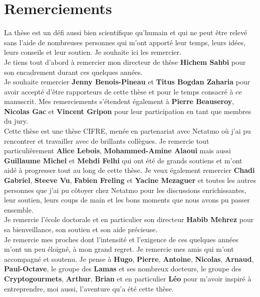 \chapter*{Remerciements}

\indent La thèse est un défi aussi bien scientifique qu'humain et qui ne peut
être relevé sans l'aide de nombreuses personnes qui m'ont apporté leur temps,
leurs idées, leurs conseils et leur soutien. Je souhaite ici les remercier.\\

Je tiens tout d'abord à remercier mon directeur de thèse \textbf{Hichem Sahbi}
pour son encadrement durant ces quelques années.\\

Je souhaite remercier \textbf{Jenny Benois-Pineau} et \textbf{Titus Bogdan
Zaharia} pour avoir accepté d'être rapporteurs de cette thèse et pour le temps
consacré à ce manuscrit. Mes remerciements s'étendent également à \textbf{Pierre
Beauseroy}, \textbf{Nicolas Gac} et \textbf{Vincent Gripon} pour leur
participation en tant que membres du jury.\\

Cette thèse est une thèse CIFRE, menée en partenariat avec Netatmo où j'ai pu
rencontrer et travailler avec de brillants collègues. Je remercie tout
particulièrement \textbf{Alice Lebois}, \textbf{Mohammed-Amine Alaoui} mais
aussi \textbf{Guillaume Michel} et \textbf{Mehdi Felhi} qui ont été de grands
soutiens et m'ont aidé à progresser tout au long de cette thèse. Je veux
également remercier \textbf{Chadi Gabriel}, \textbf{Steeve Vu}, \textbf{Fabien
Freling} et \textbf{Yacine Mezaguer} et toutes les autres personnes que j'ai pu
côtoyer chez Netatmo pour les discussions enrichissantes, leur soutien, leurs
coups de main et les bons moments que nous avons pu passer ensemble.\\

Je remercie l'école doctorale et en particulier son directeur \textbf{Habib
Mehrez} pour sa bienveillance, son soutien et son aide précieuse.\\

Je remercie mes proches dont l'intensité et l'exigence de ces quelques années
m'ont un peu éloigné, à mon grand regret. Je remercie mes amis qui m'ont
accompagné et soutenu. Je pense à \textbf{Hugo}, \textbf{Pierre},
\textbf{Antoine}, \textbf{Nicolas}, \textbf{Arnaud}, \textbf{Paul-Octave}, le
groupe des \textbf{Lamas} et ses nombreux docteurs, le groupe des
\textbf{Cryptogourmets}, \textbf{Arthur}, \textbf{Brian} et en particulier
\textbf{Léo} pour m'avoir inspiré à entreprendre, moi aussi, l'aventure qu'a été
cette thèse.\\

